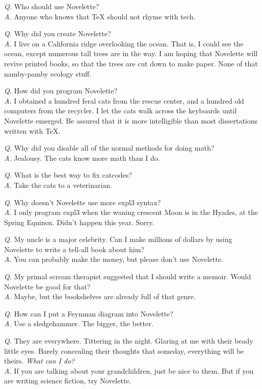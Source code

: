 \documentclass{novelette} %
\begin{document}
\begingroup\setlength\parindent{0pt}
\textit{Q.} Who should use Novelette?\\
\textit{A.} Anyone who knows that TeX should not rhyme with tech.\par
\textit{Q.} Why did you create Novelette?\\
\textit{A.} I live on a California ridge overlooking the ocean. That is,
I could see the ocean, except numerous tall trees are in the way. I am hoping
that Novelette will revive printed books, so that the trees are cut down
to make paper. None of that namby-pamby ecology stuff.\par
\textit{Q.} How did you program Novelette?\\
\textit{A.} I obtained a hundred feral cats from the rescue center, and a
hundred old computers from the recycler. I let the cats walk across the
keyboards until Novelette emerged. Be assured that it is more intelligible
than most dissertations written with TeX.\par
\textit{Q.} Why did you disable all of the normal methods for doing math?\\
\textit{A.} Jealousy. The cats know more math than I do.\par
\textit{Q.} What is the best way to fix catcodes?\\
\textit{A.} Take the cats to a veterinarian.\par
\textit{Q.} Why doesn't Novelette use more expl3 syntax?\\
\textit{A.} I only program expl3 when the waning crescent Moon is in the Hyades,
at the Spring Equinox. Didn't happen this year. Sorry.\par
\textit{Q.} My uncle is a major celebrity. Can I make millions of dollars
by using Novelette to write a tell-all book about him?\\
\textit{A.} You can probably make the money, but please don't use Novelette.\par
\textit{Q.} My primal scream therapist suggested that I should write a memoir.
Would Novelette be good for that?\\
\textit{A.} Maybe, but the bookshelves are already full of that genre.\par
\textit{Q.} How can I put a Feynman diagram into Novelette?\\
\textit{A.} Use a sledgehammer. The bigger, the better.\par
\textit{Q.} They are everywhere. Tittering in the night. Glaring at me with
their beady little eyes. Barely concealing their thoughts that someday,
everything will be theirs. \textit{What can I do?}\\
\textit{A.} If you are talking about your grandchildren, just be nice to them.
But if you are writing science fiction, try Novelette.\par
\endgroup

\makeatletter\nocle@rtoendtrue\makeatother
\end{document}
